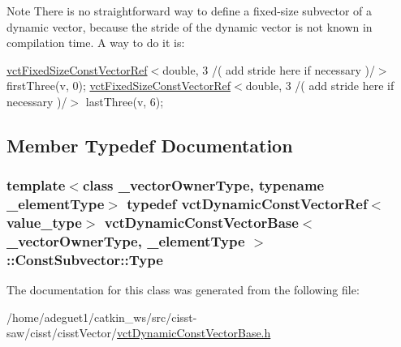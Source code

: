\begin{DoxyNote}{Note}
There is no straightforward way to define a fixed-\/size subvector of a dynamic vector, because the stride of the dynamic vector is not known in compilation time. A way to do it is\-:
\end{DoxyNote}
\hyperlink{classvct_fixed_size_const_vector_ref}{vct\-Fixed\-Size\-Const\-Vector\-Ref}$<$double, 3 /( add stride here if necessary )/$>$ first\-Three(v, 0); \hyperlink{classvct_fixed_size_const_vector_ref}{vct\-Fixed\-Size\-Const\-Vector\-Ref}$<$double, 3 /( add stride here if necessary )/$>$ last\-Three(v, 6); 

\subsection{Member Typedef Documentation}
\hypertarget{classvct_dynamic_const_vector_base_1_1_const_subvector_adbf4a3fe950a5909deb939cffbb7d9a5}{
\subsubsection[{Type}]{\setlength{\rightskip}{0pt plus 5cm}template$<$class \-\_\-vector\-Owner\-Type, typename \-\_\-element\-Type$>$ typedef {\bf vct\-Dynamic\-Const\-Vector\-Ref}$<$value\-\_\-type$>$ {\bf vct\-Dynamic\-Const\-Vector\-Base}$<$ \-\_\-vector\-Owner\-Type, \-\_\-element\-Type $>$\-::{\bf Const\-Subvector\-::\-Type}}}\label{classvct_dynamic_const_vector_base_1_1_const_subvector_adbf4a3fe950a5909deb939cffbb7d9a5}


The documentation for this class was generated from the following file\-:\begin{DoxyCompactItemize}
\item 
/home/adeguet1/catkin\-\_\-ws/src/cisst-\/saw/cisst/cisst\-Vector/\hyperlink{vct_dynamic_const_vector_base_8h}{vct\-Dynamic\-Const\-Vector\-Base.\-h}\end{DoxyCompactItemize}
